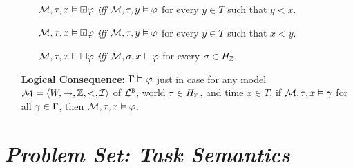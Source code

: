 \documentclass[a4paper, 11pt]{article} %
\begin{document}
\begin{enumerate}[leftmargin=1.2in]
\begin{itemize}[leftmargin=.15in]
      \item[] $\M, \tau, x \vDash \Past \metaA$ \textit{iff} $\M, \tau, y\vDash \metaA$ for every $y \in T$ such that $y < x$.
      \item[] $\M, \tau, x \vDash \Future \metaA$ \textit{iff} $\M, \tau, y\vDash \metaA$ for every $y \in T$ such that $x < y$.
      \item[] $\M, \tau, x \vDash \Box \metaA$ \textit{iff} $\M, \sigma, x\vDash \metaA$ for every $\sigma \in H_\Z$.
    \end{itemize}
  \item[\bf Logical Consequence:] $\MetaG \MLmodels[] \metaA$ just in case for any model $\M = \tuple{W, \to, \Z, <, \I}$ of $\BL$, world $\tau \in H_\Z$, and time $x \in T$, if $\M, \tau, x \vDash \metaG$ for all $\metaG \in \MetaG$, then $\M, \tau, x \vDash \metaA$.
\end{enumerate}



\section*{\it Problem Set: Task Semantics}
\end{document}
